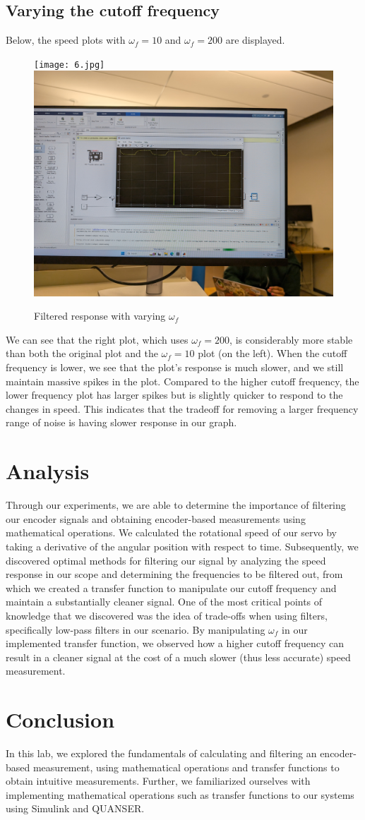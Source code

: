 \documentclass{article}
\begin{document}
\subsection{Varying the cutoff frequency}
Below, the speed plots with $\omega_f=10$ and $\omega_f=200$ are displayed. 
\begin{figure}[H]
    \centering
    \texttt{[image: 6.jpg]}
    \includegraphics[width=0.49\linewidth]{7.jpg}

    \centering
    \caption{Filtered response with varying $\omega_f$}
    \label{fig:4}
\end{figure}
We can see that the right plot, which uses $\omega_f=200$, is considerably more stable than both the original plot and the $\omega_f=10$ plot (on the left). When the cutoff frequency is lower, we see that the plot's response is much slower, and we still maintain massive spikes in the plot. Compared to the higher cutoff frequency, the lower frequency plot has larger spikes but is slightly quicker to respond to the changes in speed. This indicates that the tradeoff for removing a larger frequency range of noise is having slower response in our graph.

\section{Analysis}
Through our experiments, we are able to determine the importance of filtering our encoder signals and obtaining encoder-based measurements using mathematical operations. We calculated the rotational speed of our servo by taking a derivative of the angular position with respect to time. Subsequently, we discovered optimal methods for filtering our signal by analyzing the speed response in our scope and determining the frequencies to be filtered out, from which we created a transfer function to manipulate our cutoff frequency and maintain a substantially cleaner signal. One of the most critical points of knowledge that we discovered was the idea of trade-offs when using filters, specifically low-pass filters in our scenario. By manipulating $\omega_f$ in our implemented transfer function, we observed how a higher cutoff frequency can result in a cleaner signal at the cost of a much slower (thus less accurate) speed measurement.  

\section{Conclusion}
In this lab, we explored the fundamentals of calculating and filtering an encoder-based measurement, using mathematical operations and transfer functions to obtain intuitive measurements. Further, we familiarized ourselves with implementing mathematical operations such as transfer functions to our systems using Simulink and QUANSER.
\end{document}
